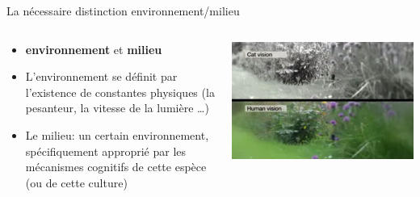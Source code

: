 \documentclass{beamer}
\begin{document}
\begin{frame}{La nécessaire distinction environnement/milieu}
\begin{columns}
\begin{column}{.7\textwidth}
     \begin{block}{}
\begin{itemize}
  \item \textbf{environnement} et \textbf{milieu}
  \item L’environnement se définit par l’existence de constantes physiques (la pesanteur, la vitesse de la lumière …)
  \item Le milieu: un certain environnement, spécifiquement approprié par les mécanismes cognitifs de cette espèce (ou de cette culture)
  
\end{itemize}
\end{block}
\end{column}
\begin{column}{.4\textwidth}
\begin{block}{}
    \includegraphics[width=\textwidth]{milieu01.png}
    \end{block}
    \end{column}
\end{columns}
\end{frame}
\end{document}
